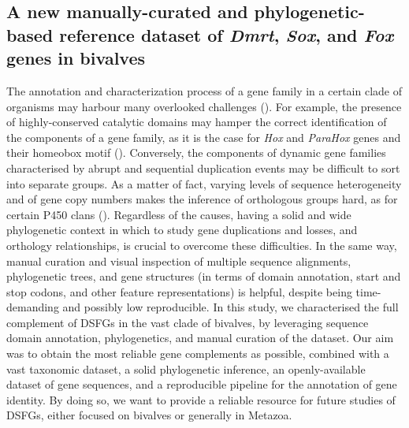 \documentclass[../main.tex]{subfiles}
\begin{document}
\subsection{A new manually-curated and phylogenetic-based reference dataset of \textit{Dmrt}, \textit{Sox}, and \textit{Fox} genes in bivalves}

The annotation and characterization process of a gene family in a certain clade of organisms may harbour many overlooked challenges (\textbf{\cite{vizueta2020bitacora}}). For example, the presence of highly-conserved catalytic domains may hamper the correct identification of the components of a gene family, as it is the case for \textit{Hox} and \textit{ParaHox} genes and their homeobox motif (\textbf{\cite{nicolini2023comparative,baldwin2018new}}). Conversely, the components of dynamic gene families characterised by abrupt and sequential duplication events may be difficult to sort into separate groups. As a matter of fact, varying levels of sequence heterogeneity and of gene copy numbers makes the inference of orthologous groups hard, as for certain P450 clans (\textbf{\cite{dermauw2020diversity}}). Regardless of the causes, having a solid and wide phylogenetic context in which to study gene duplications and losses, and orthology relationships, is crucial to overcome these difficulties. In the same way, manual curation and visual inspection of multiple sequence alignments, phylogenetic trees, and gene structures (in terms of domain annotation, start and stop codons, and other feature representations) is helpful, despite being time-demanding and possibly low reproducible. In this study, we characterised the full complement of DSFGs in the vast clade of bivalves, by leveraging sequence domain annotation, phylogenetics, and manual curation of the dataset. Our aim was to obtain the most reliable gene complements as possible, combined with a vast taxonomic dataset, a solid phylogenetic inference, an openly-available dataset of gene sequences, and a reproducible pipeline for the annotation of gene identity. By doing so, we want to provide a reliable resource for future studies of DSFGs, either focused on bivalves or generally in Metazoa.
\end{document}
